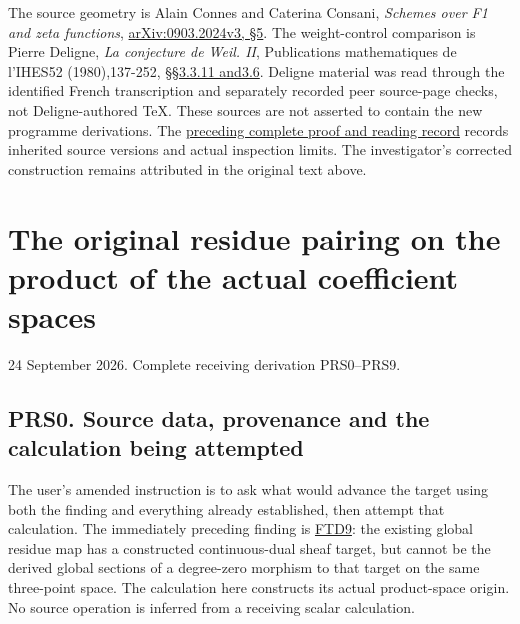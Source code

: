 The source geometry is Alain Connes and Caterina Consani, \emph{Schemes
over F1 and zeta functions},
\href{https://arxiv.org/abs/0903.2024v3}{arXiv:0903.2024v3, §5}. The
weight-control comparison is Pierre Deligne, \emph{La conjecture de
Weil. II}, Publications mathematiques de l'IHES52 (1980),137-252,
\href{https://www.numdam.org/item/PMIHES_1980__52__137_0/}{§§3.3.11
and3.6}. Deligne material was read through the identified French
transcription and separately recorded peer source-page checks, not
Deligne-authored TeX. These sources are not asserted to contain the new
programme derivations. The
\href{https://github.com/KokunoYumeto/zeta-function-research-reader/blob/36a82ecca98addb8a98b48204e349737856c7223/workbenches/splitzero-tandem/continuations/20260924-cohomology-weight-and-character-lifts/BUILD_AND_REVIEW.md}{preceding
complete proof and reading record} records inherited source versions and
actual inspection limits. The investigator's corrected construction
remains attributed in the original text above.

\chapter{The original residue pairing on the product of the actual
coefficient
spaces}\label{the-original-residue-pairing-on-the-product-of-the-actual-coefficient-spaces}

24 September 2026. Complete receiving derivation PRS0--PRS9.

\section{PRS0. Source data, provenance and the calculation being
attempted}\label{prs0.-source-data-provenance-and-the-calculation-being-attempted}

The user's amended instruction is to ask what would advance the target
using both the finding and everything already established, then attempt
that calculation. The immediately preceding finding is
\href{https://github.com/KokunoYumeto/zeta-function-research-reader/blob/main/workbenches/splitzero-tandem/continuations/20260925-full-source-tensor-and-original-divisor/counterfactual/FINITE_TOPOLOGY_DUALIZING_COMPLEX.md}{FTD9}:
the existing global residue map has a constructed continuous-dual sheaf
target, but cannot be the derived global sections of a degree-zero
morphism to that target on the same three-point space. The calculation
here constructs its actual product-space origin. No source operation is
inferred from a receiving scalar calculation.

